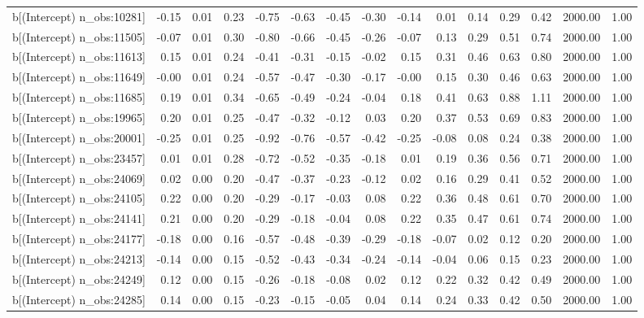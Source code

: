 \begin{table}[ht]
\begin{tabular}{rrrrrrrrrrrrrrr}
  b[(Intercept) n\_obs:10281] & -0.15 & 0.01 & 0.23 & -0.75 & -0.63 & -0.45 & -0.30 & -0.14 & 0.01 & 0.14 & 0.29 & 0.42 & 2000.00 & 1.00 \\ 
  b[(Intercept) n\_obs:11505] & -0.07 & 0.01 & 0.30 & -0.80 & -0.66 & -0.45 & -0.26 & -0.07 & 0.13 & 0.29 & 0.51 & 0.74 & 2000.00 & 1.00 \\ 
  b[(Intercept) n\_obs:11613] & 0.15 & 0.01 & 0.24 & -0.41 & -0.31 & -0.15 & -0.02 & 0.15 & 0.31 & 0.46 & 0.63 & 0.80 & 2000.00 & 1.00 \\ 
  b[(Intercept) n\_obs:11649] & -0.00 & 0.01 & 0.24 & -0.57 & -0.47 & -0.30 & -0.17 & -0.00 & 0.15 & 0.30 & 0.46 & 0.63 & 2000.00 & 1.00 \\ 
  b[(Intercept) n\_obs:11685] & 0.19 & 0.01 & 0.34 & -0.65 & -0.49 & -0.24 & -0.04 & 0.18 & 0.41 & 0.63 & 0.88 & 1.11 & 2000.00 & 1.00 \\ 
  b[(Intercept) n\_obs:19965] & 0.20 & 0.01 & 0.25 & -0.47 & -0.32 & -0.12 & 0.03 & 0.20 & 0.37 & 0.53 & 0.69 & 0.83 & 2000.00 & 1.00 \\ 
  b[(Intercept) n\_obs:20001] & -0.25 & 0.01 & 0.25 & -0.92 & -0.76 & -0.57 & -0.42 & -0.25 & -0.08 & 0.08 & 0.24 & 0.38 & 2000.00 & 1.00 \\ 
  b[(Intercept) n\_obs:23457] & 0.01 & 0.01 & 0.28 & -0.72 & -0.52 & -0.35 & -0.18 & 0.01 & 0.19 & 0.36 & 0.56 & 0.71 & 2000.00 & 1.00 \\ 
  b[(Intercept) n\_obs:24069] & 0.02 & 0.00 & 0.20 & -0.47 & -0.37 & -0.23 & -0.12 & 0.02 & 0.16 & 0.29 & 0.41 & 0.52 & 2000.00 & 1.00 \\ 
  b[(Intercept) n\_obs:24105] & 0.22 & 0.00 & 0.20 & -0.29 & -0.17 & -0.03 & 0.08 & 0.22 & 0.36 & 0.48 & 0.61 & 0.70 & 2000.00 & 1.00 \\ 
  b[(Intercept) n\_obs:24141] & 0.21 & 0.00 & 0.20 & -0.29 & -0.18 & -0.04 & 0.08 & 0.22 & 0.35 & 0.47 & 0.61 & 0.74 & 2000.00 & 1.00 \\ 
  b[(Intercept) n\_obs:24177] & -0.18 & 0.00 & 0.16 & -0.57 & -0.48 & -0.39 & -0.29 & -0.18 & -0.07 & 0.02 & 0.12 & 0.20 & 2000.00 & 1.00 \\ 
  b[(Intercept) n\_obs:24213] & -0.14 & 0.00 & 0.15 & -0.52 & -0.43 & -0.34 & -0.24 & -0.14 & -0.04 & 0.06 & 0.15 & 0.23 & 2000.00 & 1.00 \\ 
  b[(Intercept) n\_obs:24249] & 0.12 & 0.00 & 0.15 & -0.26 & -0.18 & -0.08 & 0.02 & 0.12 & 0.22 & 0.32 & 0.42 & 0.49 & 2000.00 & 1.00 \\ 
  b[(Intercept) n\_obs:24285] & 0.14 & 0.00 & 0.15 & -0.23 & -0.15 & -0.05 & 0.04 & 0.14 & 0.24 & 0.33 & 0.42 & 0.50 & 2000.00 & 1.00 \\ 

\end{tabular}
\end{table}
